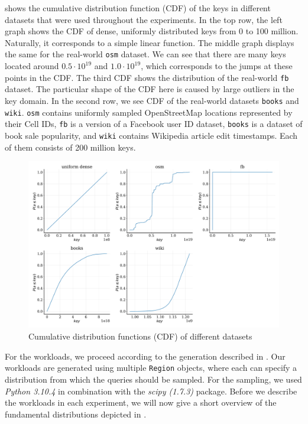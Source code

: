  shows the cumulative distribution function (CDF) of the keys in different datasets that were used throughout the experiments. In the top row, the left graph shows the CDF of dense, uniformly distributed keys from 0 to 100 million. Naturally, it corresponds to a simple linear function. The middle graph displays the same for the real-world \verb|osm| dataset. We can see that there are many keys located around $0.5 \cdot 10^{19}$ and $1.0 \cdot 10^{19}$, which corresponds to the jumps at these points in the CDF. The third CDF shows the distribution of the real-world \verb|fb| dataset. The particular shape of the CDF here is caused by large outliers in the key domain. In the second row, we see CDF of the real-world datasets \verb|books| and \verb|wiki|. \verb|osm| contains uniformly sampled OpenStreetMap locations represented by their Cell IDs, \verb|fb| is a version of a Facebook user ID dataset, \verb|books| is a dataset of book sale popularity, and \verb|wiki| contains Wikipedia article edit timestamps. Each of them consists of 200 million keys.

\begin{figure}
    \centering
    \includegraphics[width=\textwidth]{figures/cdfs.pdf}
    \caption{Cumulative distribution functions (CDF) of different datasets}
    \label{fig:cdfs}
\end{figure}

For the workloads, we proceed according to the generation described in . Our workloads are generated using multiple \verb|Region| objects, where each can specify a distribution from which the queries should be sampled. For the sampling, we used \textit{Python 3.10.4} in combination with the \textit{scipy (1.7.3)} package. Before we describe the workloads in each experiment, we will now give a short overview of the fundamental distributions depicted in . 

